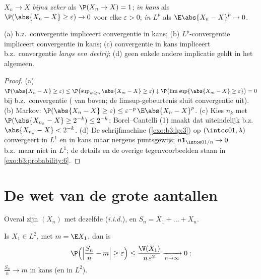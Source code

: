 \begin{definition}\label{def:b3:probability:modes}
$X_n \to X$ \emph{bijna zeker} als $\P(X_n \to X) = 1$; \emph{in
kans} als $\P(\abs{X_n - X} \geq \varepsilon) \to 0$ voor elke
$\varepsilon > 0$; \emph{in $L^p$} als $\E\abs{X_n - X}^p \to
0$.
\end{definition}

\begin{proposition}\label{prop:b3:probability:modes}
(a) b.z.\ convergentie impliceert convergentie in kans;
(b) $L^p$-convergentie impliceert convergentie in kans;
(c) convergentie in kans impliceert b.z.\ convergentie \emph{langs
een deelrij};
(d) geen enkele andere implicatie geldt in het algemeen.
\end{proposition}

\begin{proof}
(a) $\P(\abs{X_n - X} \geq \varepsilon) \leq
\P\bigl(\sup_{m\geq n}\abs{X_m - X} \geq \varepsilon\bigr)
\downarrow \P\bigl(\limsup\{\abs{X_m - X} \geq
\varepsilon\}\bigr) = 0$ bij b.z.\ convergentie ( van
boven; de limsup-gebeurtenis sluit convergentie uit). (b) Markov:
$\P(\abs{X_n - X} \geq \varepsilon) \leq
\varepsilon^{-p}\,\E\abs{X_n - X}^p$. (c) Kies $n_k$ met
$\P(\abs{X_{n_k} - X} \geq 2^{-k}) \leq 2^{-k}$;
Borel--Cantelli (1) maakt dat uiteindelijk b.z.\ $\abs{X_{n_k} -
X} < 2^{-k}$. (d) De schrijfmachine (\cref{exo:b3:lp:3}) op
$(\intcc01, \lambda)$ convergeert in $L^1$ en in kans maar
nergens puntsgewijs; $n\mathbf 1_{\intoo0{1/n}} \to 0$ b.z.\ maar
niet in $L^1$; de details en de overige tegenvoorbeelden staan in
\cref{exo:b3:probability:6}.
\end{proof}

\section{De wet van de grote aantallen}

Overal zijn $(X_n)$  met dezelfde 
(\emph{i.i.d.}), en $S_n = X_1 + \dots + X_n$.

\begin{theorem}
\label{thm:b3:probability:wlln}
Is $X_1 \in L^2$, met $m = \E X_1$, dan is
\[
\P\Bigl(\Bigl|\frac{S_n}{n} - m\Bigr| \geq
\varepsilon\Bigr) \leq
\frac{\V(X_1)}{n\,\varepsilon^2}
\xrightarrow[n\to\infty]{} 0 :
\]
$\frac{S_n}n \to m$ in kans (en in $L^2$).
\end{theorem}


